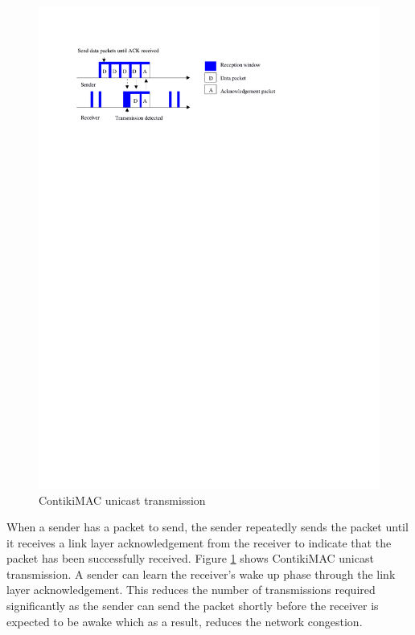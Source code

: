 \begin{figure}
\centering
\includegraphics[trim=2cm 22cm 6cm 2cm, clip=true, totalheight=0.25\textheight]{contikimac.pdf}
\caption{ContikiMAC unicast transmission}
\label{fig_contikimac}
\end{figure}

When a sender has a packet to send, the sender repeatedly sends the packet until it receives a link layer acknowledgement from the receiver to indicate that the packet has been successfully received. Figure \ref{fig_contikimac} shows ContikiMAC unicast transmission. A sender can learn the receiver's wake up phase through the link layer acknowledgement. This reduces the number of transmissions required significantly as the sender can send the packet shortly before the receiver is expected to be awake which as a result, reduces the network congestion.

